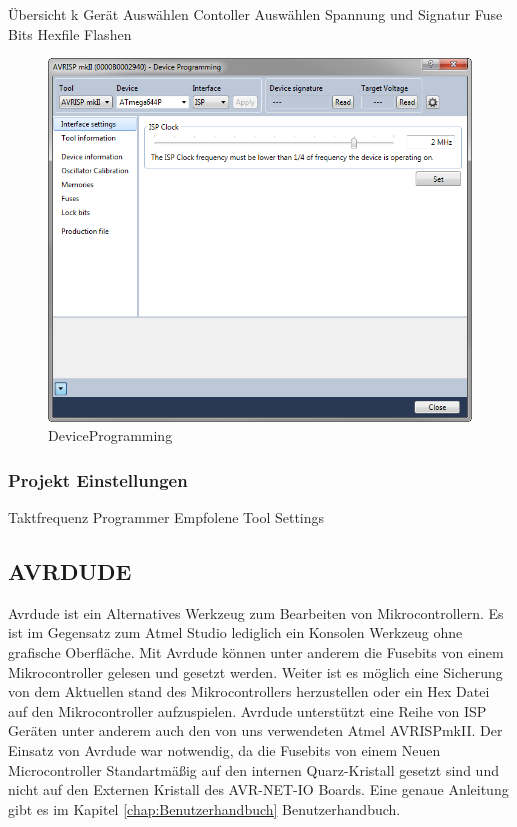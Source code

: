 Übersicht k Gerät Auswählen
Contoller Auswählen
Spannung und Signatur
Fuse Bits
Hexfile Flashen

\begin{figure}[h]
\centering
\includegraphics[width=13cm]{content/pictures/Anleitung/neuerProzessor/AnleitungNeuerProzessor1.png}
\caption{DeviceProgramming}
\label{fig:B3}
\end{figure}

\subsubsection{Projekt Einstellungen}

Taktfrequenz
Programmer
Empfolene Tool Settings

\subsection{AVRDUDE}

Avrdude ist ein Alternatives Werkzeug zum Bearbeiten von Mikrocontrollern. Es
ist im Gegensatz zum Atmel Studio lediglich ein Konsolen Werkzeug ohne
grafische Oberfläche. Mit Avrdude können unter anderem die Fusebits von einem
Mikrocontroller gelesen und gesetzt werden. Weiter ist es möglich eine Sicherung
von dem Aktuellen stand des Mikrocontrollers herzustellen oder ein Hex Datei auf
den Mikrocontroller aufzuspielen. Avrdude unterstützt eine Reihe von ISP Geräten
unter anderem auch den von uns verwendeten Atmel AVRISPmkII. Der Einsatz von
Avrdude war notwendig, da die Fusebits von einem Neuen Microcontroller
Standartmäßig auf den internen Quarz-Kristall gesetzt sind und nicht auf den
Externen Kristall des AVR-NET-IO Boards.
Eine genaue Anleitung gibt es im Kapitel \ref{chap:Benutzerhandbuch}
Benutzerhandbuch.

